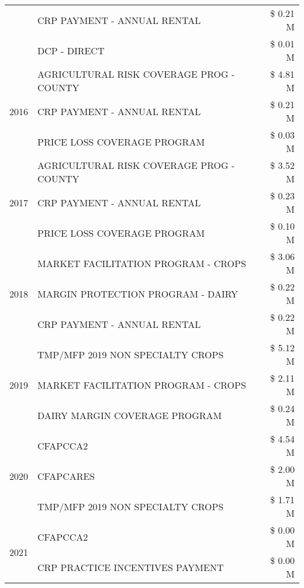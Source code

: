 \begin{tabular}{llr}
 & CRP PAYMENT - ANNUAL RENTAL & \$ 0.21 M \\
 & DCP - DIRECT & \$ 0.01 M \\
\cline{1-3}
\multirow[t]{3}{*}{2016} & AGRICULTURAL RISK COVERAGE PROG - COUNTY & \$ 4.81 M \\
 & CRP PAYMENT - ANNUAL RENTAL & \$ 0.21 M \\
 & PRICE LOSS COVERAGE PROGRAM & \$ 0.03 M \\
\cline{1-3}
\multirow[t]{3}{*}{2017} & AGRICULTURAL RISK COVERAGE PROG - COUNTY & \$ 3.52 M \\
 & CRP PAYMENT - ANNUAL RENTAL & \$ 0.23 M \\
 & PRICE LOSS COVERAGE PROGRAM & \$ 0.10 M \\
\cline{1-3}
\multirow[t]{3}{*}{2018} & MARKET FACILITATION PROGRAM - CROPS & \$ 3.06 M \\
 & MARGIN PROTECTION PROGRAM - DAIRY & \$ 0.22 M \\
 & CRP PAYMENT - ANNUAL RENTAL & \$ 0.22 M \\
\cline{1-3}
\multirow[t]{3}{*}{2019} & TMP/MFP 2019 NON SPECIALTY CROPS & \$ 5.12 M \\
 & MARKET FACILITATION PROGRAM - CROPS & \$ 2.11 M \\
 & DAIRY MARGIN COVERAGE PROGRAM & \$ 0.24 M \\
\cline{1-3}
\multirow[t]{3}{*}{2020} & CFAPCCA2 & \$ 4.54 M \\
 & CFAPCARES & \$ 2.00 M \\
 & TMP/MFP 2019 NON SPECIALTY CROPS & \$ 1.71 M \\
\cline{1-3}
\multirow[t]{2}{*}{2021} & CFAPCCA2 & \$ 0.00 M \\
 & CRP PRACTICE INCENTIVES PAYMENT & \$ 0.00 M \\
\cline{1-3}
\bottomrule
\end{tabular}
